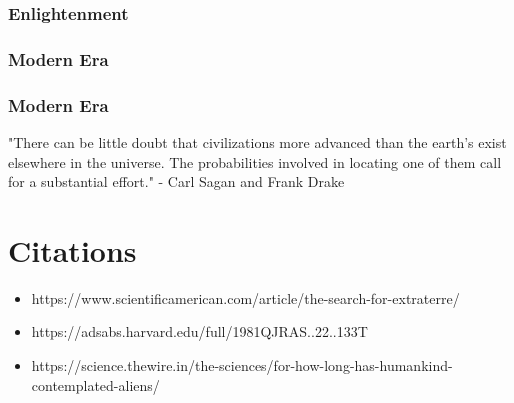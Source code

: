 \documentclass{beamer}
\begin{document}
\begin{frame}
\frametitle{Enlightenment}
\end{frame}


\begin{frame}
\frametitle{Modern Era}
\end{frame}

\begin{frame}
\frametitle{Modern Era}
"There can be little doubt that civilizations more advanced than the earth's
 exist elsewhere in the universe. The probabilities involved in locating one of them
 call for a substantial effort." - Carl Sagan and Frank Drake
\end{frame}

\section{Citations}
\begin{frame}
\begin{itemize}
    \item \scriptsize{https://www.scientificamerican.com/article/the-search-for-extraterre/}
    \item \scriptsize{https://adsabs.harvard.edu/full/1981QJRAS..22..133T}
    \item \scriptsize{https://science.thewire.in/the-sciences/for-how-long-has-humankind-contemplated-aliens/}
\end{itemize}
\end{frame}
\end{document}
